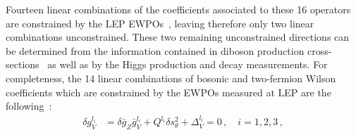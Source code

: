 Fourteen linear combinations of the coefficients associated to these 16 operators  
are constrained by the LEP EWPOs~\cite{Falkowski:2014tna},
leaving therefore only two linear combinations unconstrained. 
%
These two remaining unconstrained directions  can be
determined  from the information contained in
diboson production cross-sections~\cite{Grojean:2006nn,Alonso:2013hga,Brivio:2017bnu}
as well as by the Higgs production and decay measurements.
{ 
For completeness, the 14 linear combinations of bosonic and two-fermion Wilson coefficients 
which are constrained by the EWPOs measured at LEP are the following~\cite{Brivio:2017bnu}:
\begin{align}
\nonumber
\delta g_{V}^{l_i}&=\delta \bar{g}_{Z} \bar{g}_{V}^{l_i}+Q^{l_i} \delta s_{\theta}^{2}+\Delta_{V}^{l_i} = 0\, , \quad i=1,2,3\, , \\\nonumber

\end{align}}
